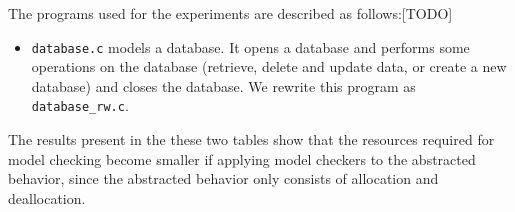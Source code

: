 The programs used for the experiments are described as follows:[TODO]
\begin{itemize}
\item \texttt{database.c} models a database. It opens a database and
  performs some operations on the database (retrieve, delete and
  update data, or create a new database) and closes the database. We
  rewrite this program as \texttt{database\_rw.c}.
\end{itemize}

The results present in the these two tables show that the
resources required for model checking become smaller if applying model
checkers to the abstracted behavior, since the abstracted behavior
only consists of allocation and deallocation.

